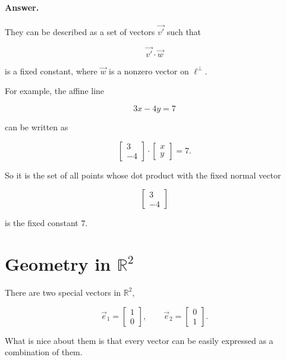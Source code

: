 \paragraph{Answer.}
They can be described as a set of vectors $\vec{v'}$ such that

$$
\vec{v'}\cdot \vec w
$$

is a fixed constant, where $\vec w$ is a nonzero vector on $\ell^\perp$.

For example, the affine line

$$
3x-4y=7
$$

can be written as

$$
\begin{bmatrix}
3\\
-4
\end{bmatrix}
\cdot
\begin{bmatrix}
x\\
y
\end{bmatrix}
=7.
$$

So it is the set of all points whose dot product with the fixed normal vector

$$
\begin{bmatrix}
3\\
-4
\end{bmatrix}
$$

is the fixed constant $7$.




\section{Geometry in \texorpdfstring{$\mathbb{R}^2$}{R2}}

There are two special vectors in $\mathbb{R}^2$,

\[
\vec e_1=
\begin{bmatrix}
1\\
0
\end{bmatrix},
\qquad
\vec e_2=
\begin{bmatrix}
0\\
1
\end{bmatrix}.
\]

What is nice about them is that every vector can be easily expressed as a
combination of them.

